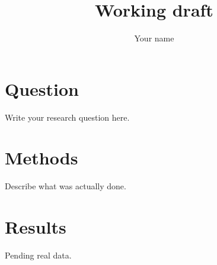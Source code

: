 \documentclass{article}
\begin{document}
\title{Working draft}
\author{Your name}
\maketitle
\section{Question}
Write your research question here.
\section{Methods}
Describe what was actually done.
\section{Results}
Pending real data.
\end{document}
